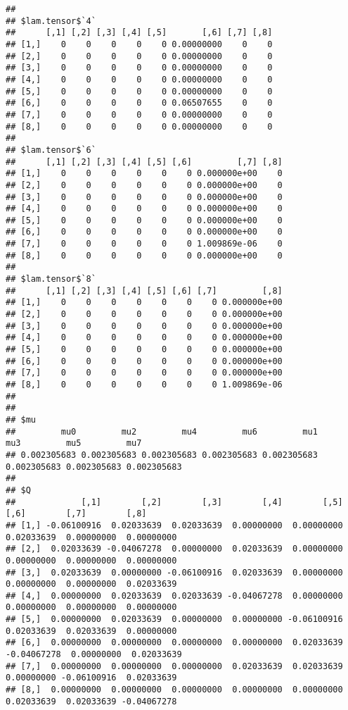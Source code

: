 \documentclass[
]{article}
\begin{document}
\begin{verbatim}
## 
## $lam.tensor$`4`
##      [,1] [,2] [,3] [,4] [,5]       [,6] [,7] [,8]
## [1,]    0    0    0    0    0 0.00000000    0    0
## [2,]    0    0    0    0    0 0.00000000    0    0
## [3,]    0    0    0    0    0 0.00000000    0    0
## [4,]    0    0    0    0    0 0.00000000    0    0
## [5,]    0    0    0    0    0 0.00000000    0    0
## [6,]    0    0    0    0    0 0.06507655    0    0
## [7,]    0    0    0    0    0 0.00000000    0    0
## [8,]    0    0    0    0    0 0.00000000    0    0
## 
## $lam.tensor$`6`
##      [,1] [,2] [,3] [,4] [,5] [,6]         [,7] [,8]
## [1,]    0    0    0    0    0    0 0.000000e+00    0
## [2,]    0    0    0    0    0    0 0.000000e+00    0
## [3,]    0    0    0    0    0    0 0.000000e+00    0
## [4,]    0    0    0    0    0    0 0.000000e+00    0
## [5,]    0    0    0    0    0    0 0.000000e+00    0
## [6,]    0    0    0    0    0    0 0.000000e+00    0
## [7,]    0    0    0    0    0    0 1.009869e-06    0
## [8,]    0    0    0    0    0    0 0.000000e+00    0
## 
## $lam.tensor$`8`
##      [,1] [,2] [,3] [,4] [,5] [,6] [,7]         [,8]
## [1,]    0    0    0    0    0    0    0 0.000000e+00
## [2,]    0    0    0    0    0    0    0 0.000000e+00
## [3,]    0    0    0    0    0    0    0 0.000000e+00
## [4,]    0    0    0    0    0    0    0 0.000000e+00
## [5,]    0    0    0    0    0    0    0 0.000000e+00
## [6,]    0    0    0    0    0    0    0 0.000000e+00
## [7,]    0    0    0    0    0    0    0 0.000000e+00
## [8,]    0    0    0    0    0    0    0 1.009869e-06
## 
## 
## $mu
##         mu0         mu2         mu4         mu6         mu1         mu3         mu5         mu7 
## 0.002305683 0.002305683 0.002305683 0.002305683 0.002305683 0.002305683 0.002305683 0.002305683 
## 
## $Q
##             [,1]        [,2]        [,3]        [,4]        [,5]        [,6]        [,7]        [,8]
## [1,] -0.06100916  0.02033639  0.02033639  0.00000000  0.00000000  0.02033639  0.00000000  0.00000000
## [2,]  0.02033639 -0.04067278  0.00000000  0.02033639  0.00000000  0.00000000  0.00000000  0.00000000
## [3,]  0.02033639  0.00000000 -0.06100916  0.02033639  0.00000000  0.00000000  0.00000000  0.02033639
## [4,]  0.00000000  0.02033639  0.02033639 -0.04067278  0.00000000  0.00000000  0.00000000  0.00000000
## [5,]  0.00000000  0.02033639  0.00000000  0.00000000 -0.06100916  0.02033639  0.02033639  0.00000000
## [6,]  0.00000000  0.00000000  0.00000000  0.00000000  0.02033639 -0.04067278  0.00000000  0.02033639
## [7,]  0.00000000  0.00000000  0.00000000  0.02033639  0.02033639  0.00000000 -0.06100916  0.02033639
## [8,]  0.00000000  0.00000000  0.00000000  0.00000000  0.00000000  0.02033639  0.02033639 -0.04067278
\end{verbatim}
\end{document}
